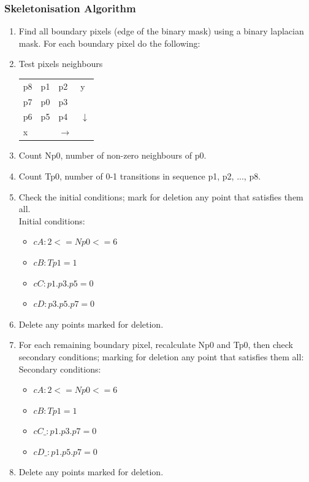 \documentclass[a4paper, 12pt]{article}
\begin{document}
	\subsubsection{Skeletonisation Algorithm}
        \begin{enumerate}
   		\item Find all boundary pixels (edge of the binary mask) using a binary laplacian mask\cite{binary_laplacian}. For each boundary pixel do the following:
        \item{Test pixels neighbours
\begin{table}[H]
\centering
\begin{tabular}{llll}
\cline{1-3}
\multicolumn{1}{|l|}{p8} & \multicolumn{1}{l|}{p1} & \multicolumn{1}{l|}{p2} & y \\ \cline{1-3}
\multicolumn{1}{|l|}{p7} & \multicolumn{1}{l|}{p0} & \multicolumn{1}{l|}{p3} &  \\ \cline{1-3}
\multicolumn{1}{|l|}{p6} & \multicolumn{1}{l|}{p5} & \multicolumn{1}{l|}{p4} & $\downarrow$ \\ \cline{1-3}
x &  & $\rightarrow$ & 
\end{tabular}
\end{table}}
%
        \item Count Np0, number of non-zero neighbours of p0.
        \item Count Tp0, number of 0-1 transitions in sequence p1, p2, ..., p8.
        \item Check the initial conditions; mark for deletion any point that satisfies them all.\\
        Initial conditions:
        \begin{itemize}
         \item $cA:     2 <= Np0 <= 6$
         \item $cB:     Tp1 = 1$
         \item $cC:     p1 . p3 . p5 = 0$
         \item $cD:     p3 . p5 . p7 = 0$
         \end{itemize} 
         
        \item Delete any points marked for deletion.
        \item For each remaining boundary pixel, recalculate Np0 and Tp0, then check secondary conditions; marking for deletion any point that satisfies them all:\\
Secondary conditions:
        \begin{itemize}
        \item $cA:     2 <= Np0 <= 6$
        \item $cB:     Tp1 = 1$
        \item $cC\_:    p1 . p3 . p7 = 0$
        \item $cD\_:    p1 . p5 . p7 = 0$
        \end{itemize}
        \item Delete any points marked for deletion.
        \end{enumerate}
\end{document}
